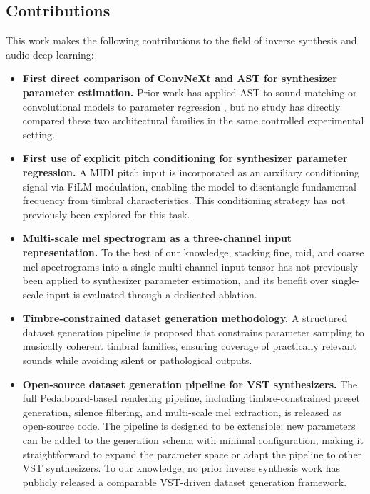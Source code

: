 \subsection{Contributions}

This work makes the following contributions to the field of inverse synthesis and audio deep learning:

\begin{itemize}

\item[$\blacksquare$] \textbf{First direct comparison of ConvNeXt and AST for synthesizer parameter estimation.} Prior work has applied AST to sound matching \cite{bruford2024ast} or convolutional models to parameter regression \cite{barkan2019inversynth}, but no study has directly compared these two architectural families in the same controlled experimental setting.

\item[$\blacksquare$] \textbf{First use of explicit pitch conditioning for synthesizer parameter regression.} A MIDI pitch input is incorporated as an auxiliary conditioning signal via FiLM modulation, enabling the model to disentangle fundamental frequency from timbral characteristics. This conditioning strategy has not previously been explored for this task.

\item[$\blacksquare$] \textbf{Multi-scale mel spectrogram as a three-channel input representation.} To the best of our knowledge, stacking fine, mid, and coarse mel spectrograms into a single multi-channel input tensor has not previously been applied to synthesizer parameter estimation, and its benefit over single-scale input is evaluated through a dedicated ablation.

\item[$\blacksquare$] \textbf{Timbre-constrained dataset generation methodology.} A structured dataset generation pipeline is proposed that constrains parameter sampling to musically coherent timbral families, ensuring coverage of practically relevant sounds while avoiding silent or pathological outputs.

\item[$\blacksquare$] \textbf{Open-source dataset generation pipeline for VST synthesizers.} The full Pedalboard-based rendering pipeline, including timbre-constrained preset generation, silence filtering, and multi-scale mel extraction, is released as open-source code. The pipeline is designed to be extensible: new parameters can be added to the generation schema with minimal configuration, making it straightforward to expand the parameter space or adapt the pipeline to other VST synthesizers. To our knowledge, no prior inverse synthesis work has publicly released a comparable VST-driven dataset generation framework.


\end{itemize}
